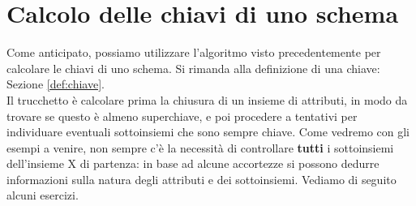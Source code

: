 \documentclass[12pt]{report}
\begin{document}
	\section{Calcolo delle chiavi di uno schema}
	Come anticipato, possiamo utilizzare l'algoritmo visto precedentemente per calcolare le chiavi di uno schema. Si rimanda alla definizione di una chiave: Sezione \ref{def:chiave}.\\
	Il trucchetto è calcolare prima la chiusura di un insieme di attributi, in modo da trovare se questo è almeno superchiave, e poi procedere a tentativi per individuare eventuali sottoinsiemi che sono sempre chiave. Come vedremo con gli esempi a venire, non sempre c'è la necessità di controllare \textbf{tutti} i sottoinsiemi dell'insieme X di partenza: in base ad alcune accortezze si possono dedurre informazioni sulla natura degli attributi e dei sottoinsiemi. Vediamo di seguito alcuni esercizi.
\end{document}
